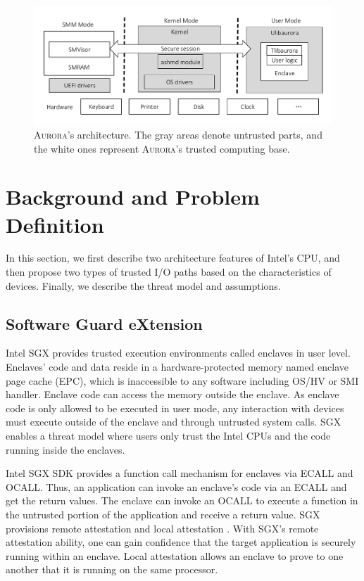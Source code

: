 \documentclass[journal,twocolumn,letterpaper,10pt]{IEEEtran}
\begin{document}
\begin{figure}[t]
	\centering
	\includegraphics[height=0.22\textheight]{figures/arch.pdf}
	\caption{\textsc{Aurora}'s architecture. The gray areas denote untrusted parts, and the white ones represent \textsc{Aurora}'s trusted computing base.}
	\label{fig:architecture}
\end{figure}

\section{Background and Problem Definition}
In this section, we first describe two architecture features of Intel's CPU, and then propose two types of trusted I/O paths based on the characteristics of devices. Finally, we describe the threat model and assumptions.

\subsection{Software Guard eXtension}
Intel SGX \cite{DBLP:conf/isca/McKeenABRSSS13} provides trusted execution environments called enclaves in user level. Enclaves' code and data reside in a hardware-protected memory named enclave page cache (EPC), which is inaccessible to any software including OS/HV or SMI handler. Enclave code can access the memory outside the enclave. As enclave code is only allowed to be executed in user mode, any interaction with devices must execute outside of the enclave and through untrusted system calls. SGX enables a threat model where users only trust the Intel CPUs and the code running inside the enclaves.

Intel SGX SDK provides a function call mechanism for enclaves via ECALL and OCALL.  Thus, an application can invoke an enclave's code via an ECALL and get the return values. The enclave can invoke an OCALL to execute a function in the untrusted portion of the application and receive a return value. SGX provisions remote attestation and local attestation \cite{Anati2013InnovativeTF}. With SGX's remote attestation ability, one can gain confidence that the target application is securely running within an enclave. Local attestation allows an enclave to prove to one another that it is running on the same processor.
\end{document}
